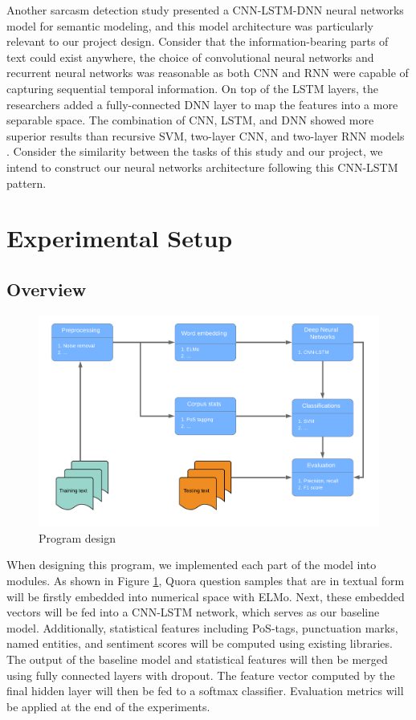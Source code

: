 \documentclass[12pt]{diazessay} %
\begin{document}
Another sarcasm detection study \citep{ghosh2016} presented a CNN-LSTM-DNN neural networks model for semantic modeling, and this model architecture was particularly relevant to our project design. Consider that the information-bearing parts of text could exist anywhere, the choice of convolutional neural networks and recurrent neural networks was reasonable as both CNN and RNN were capable of capturing sequential temporal information. On top of the LSTM layers, the researchers added a fully-connected DNN layer to map the features into a more separable space. The combination of CNN, LSTM, and DNN showed more superior results than recursive SVM, two-layer CNN, and two-layer RNN models \citep{ghosh2016}. Consider the similarity between the tasks of this study and our project, we intend to construct our neural networks architecture following this CNN-LSTM pattern. 

\section{Experimental Setup}

\subsection{Overview}
\begin{figure}[ht]
	\includegraphics[width=0.6\textheight, center]{graphs/program_desi_flow.png}
	\caption{Program design}
	\label{figure:program_design}
\end{figure}
When designing this program, we implemented each part of the model into modules. As shown in Figure \ref{figure:program_design}, Quora question samples that are in textual form will be firstly embedded into numerical space with ELMo. Next, these embedded vectors will be fed into a CNN-LSTM network, which serves as our baseline model. Additionally, statistical features including PoS-tags, punctuation marks, named entities, and sentiment scores will be computed using existing libraries. The output of the baseline model and statistical features will then be merged using fully connected layers with dropout. The feature vector computed by the final hidden layer will then be fed to a softmax classifier. Evaluation metrics will be applied at the end of the experiments.
\end{document}
